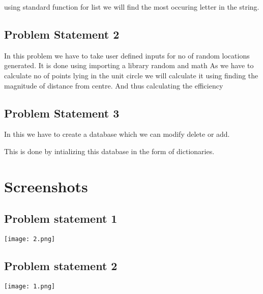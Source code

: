 \documentclass[10pt]{article}
\begin{document}
using standard function for list we will find the most occuring letter in the string.


\bigskip

\subsection{Problem Statement 2}

In this problem we have to take user defined inputs for no of random locations generated.
It is done using importing a library random and math
As we have to calculate no of points lying in the unit circle we will calculate it using finding the magnitude of distance from centre.
And thus calculating the efficiency



\bigskip

\subsection{Problem Statement 3}

In this we have to create a database which we can modify delete or add.

This is done by intializing this database in the form of dictionaries.






\bigskip








\newpage


\section{Screenshots}

\subsection{Problem statement 1}

 \texttt{[image: 2.png]} 





\newpage




\subsection{Problem statement 2}

\texttt{[image: 1.png]} 
\end{document}

